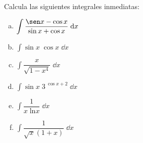 \begin{ejre} Calcula las siguientes integrales inmediatas:
\begin{multicols}{2}
\begin{enumerate}[a) ]
	\item $\displaystyle \int \dfrac {\sen x - \cos x}{\sin x + \cos x} \; \dd x$
	\item $\displaystyle \int \sin x \; \cos x  \; \dd x$
	\item $\displaystyle \int \dfrac {x}{\sqrt{1-x^4}} \; \dd x$
	\item $\displaystyle \int \sin x \;  3^{\; \cos x + 2} \; \dd x$
	\item $\displaystyle \int \dfrac {1}{x\; \mathrm{ln}x} \; \dd x$
	\item $\displaystyle \int \dfrac {1}{\sqrt{x}(1+x)} \; \dd x$
\end{enumerate}	
\end{multicols}
\end{ejre}
	
